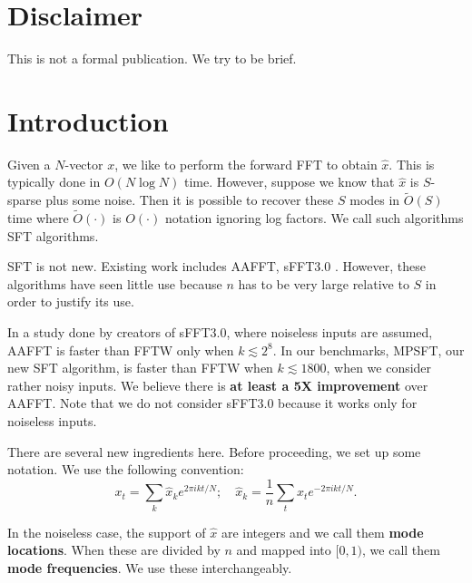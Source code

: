 \documentclass[10pt]{article}
\begin{document}
\pagestyle{plain}
\maketitle

\section*{Disclaimer}
This is not a formal publication. We try to be brief.

\section{Introduction}
Given a $N$-vector $x$, we like to perform the forward FFT to obtain $\hat{x}$. This is typically done in $O(N \log N)$ time. However, suppose we know that $\hat{x}$ is $S$-sparse plus some noise. Then it is possible to recover these $S$ modes in $\tilde{O}(S)$ time where $\tilde{O}(\cdot)$ is $O(\cdot)$ notation ignoring log factors. We call such algorithms SFT algorithms.

SFT is not new. Existing work includes AAFFT\cite{iwen2007empirical}, sFFT3.0 \cite{hassanieh2012simple, hassanieh2012nearly}. However, these algorithms have seen little use because $n$ has to be very large relative to $S$ in order to justify its use.

In a study done by creators of sFFT3.0, where noiseless inputs are assumed, AAFFT is faster than FFTW only when $k\lesssim 2^8$. In our benchmarks, MPSFT, our new SFT algorithm, is faster than FFTW when $k \lesssim 1800$, when we consider rather noisy inputs. We believe there is \textbf{at least a 5X improvement} over AAFFT. Note that we do not consider sFFT3.0 because it works only for noiseless inputs.

There are several new ingredients here. Before proceeding, we set up some notation. We use the following convention:
$$x_t = \sum_k \hat{x}_k e^{2\pi i kt/N}; \quad \hat{x}_k =\frac{1}{n} \sum_t x_t e^{-2\pi i k t/N}.$$

In the noiseless case, the support of $\hat{x}$ are integers and we call them \textbf{mode locations}. When these are divided by $n$ and mapped into $[0,1)$, we call them \textbf{mode frequencies}. We use these interchangeably.
\end{document}
